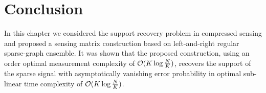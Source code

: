 \section{Conclusion}
In this chapter we considered the support recovery problem in compressed sensing and proposed a sensing matrix construction based on left-and-right regular sparse-graph ensemble. It was shown that the proposed construction, using an order optimal measurement complexity of $\mathcal{O}(K\log\frac{N}{K})$, recovers the support of the sparse signal with asymptotically vanishing error probability in optimal sub-linear time complexity of $\mathcal{O}(K\log\frac{N}{K})$.
%
%
%
